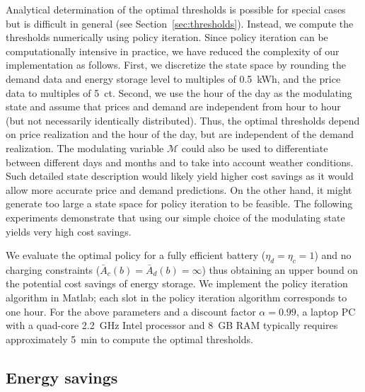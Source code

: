 \documentclass[journal]{IEEEtran}
\newcommand{\Amax}{\bar{A}}
\newcommand\1{\mathbf{1}}
\begin{document}
Analytical determination of the optimal thresholds is possible for special cases but is difficult in general (see Section~\ref{sec:thresholds}). Instead, we compute the thresholds numerically using policy iteration.
Since policy iteration can be computationally intensive in practice, we have reduced the complexity of our implementation as follows.  First, we discretize the state space by rounding the demand data and energy storage level to multiples of 0.5~kWh, and the price data to multiples of 5~ct.  Second, we use the hour of the day as the modulating state and assume that prices and demand are independent from hour to hour (but not necessarily identically distributed). Thus, the optimal thresholds depend on price realization and the hour of the day, but are independent of the demand realization.
The modulating variable $\mathcal{M}$ could also be used to differentiate between different days and months and to take into account weather conditions. Such detailed state description would likely yield higher cost savings as it would allow more accurate price and demand predictions. On the other hand, it might generate too large a state space for policy iteration to be feasible. The following experiments demonstrate that using our simple choice of the modulating state yields very high cost savings.

We evaluate the optimal policy for a fully efficient battery ($\eta_d = \eta_c = 1$)
and no charging constraints ($\Amax_c(b) = \Amax_d(b) = \infty$) thus obtaining an upper bound on the
potential cost savings of energy storage.
We implement the policy iteration algorithm in Matlab; each slot in the policy iteration algorithm corresponds to one hour.
For the above parameters and a discount factor $\alpha = 0.99$,
a laptop PC with a quad-core 2.2~GHz Intel processor and 8~GB RAM typically requires
approximately 5~min to compute the optimal thresholds.


\subsection{Energy savings}\label{subsec:savings}
\end{document}
